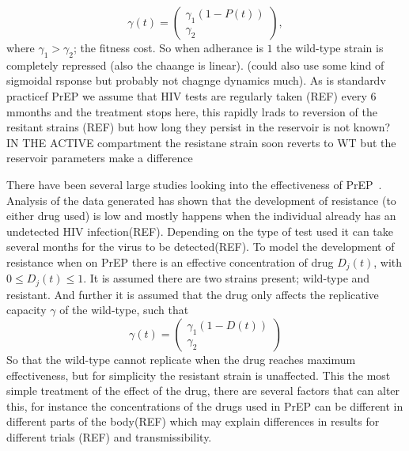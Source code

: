 \documentclass[DIV=15]{scrartcl}
\begin{document}
 \begin{equation}
\gamma (t) = \begin{pmatrix}
\gamma_1(1- P(t)) \\ \gamma_2
\end{pmatrix} , 
\label{gamma}
\end{equation}
where $\gamma_1>\gamma_2$; the fitness cost.
So when adherance is $1$ the wild-type strain is completely repressed (also the chaange is linear). (could also use some kind of sigmoidal rsponse but probably not chagnge dynamics much).  As is standardv  practicef PrEP we assume that HIV tests are regularly taken (REF) every 6 mmonths and the treatment stops here, this  rapidly  lrads to reversion of the resitant strains (REF) but how long they persist in the reservoir is not known?  IN THE ACTIVE compartment the resistane strain soon reverts to WT but the reservoir parameters make a difference 
\fi

 \iffalse
some stuff about  tenofovir resistane mutatns
\url{http://www.ncbi.nlm.nih.gov/pmc/articles/PMC3494163/}


rho is outflow -inflow no mutation low rtae in this model $ \rho = a-k/r_L$


mean generstion time in reservoir is1/a HIV

viral geneeration  is 1 day in active compartment 

\fi





There have been several large studies looking into the effectiveness of PrEP~\cite{iprex2011,partners2012}. Analysis of the data  generated has shown that the development of resistance (to either drug used) is low and mostly happens when the individual already has an undetected HIV infection(REF). Depending on the type of test used  it can take several months for the virus to be detected(REF). To  model the development of resistance when on PrEP there is an effective concentration of drug $D_j(t)$, with $0 \leq D_j(t) \leq 1$. It is assumed there are two strains present; wild-type and resistant. And further it is assumed that the drug only affects the replicative  capacity $\gamma$ of the wild-type, such that \begin{equation*}
 \gamma(t) = \begin{pmatrix} \gamma_1(1- D(t)) \\ \gamma_2 \end{pmatrix}
\end{equation*}
So that the wild-type cannot  replicate when the drug reaches maximum effectiveness, but for simplicity the resistant strain is unaffected.
This the most simple treatment of the effect of the drug, there are several factors that can alter  this, for instance the concentrations of the drugs used in PrEP can be different in different parts of the body(REF)
 which may explain differences in results for different trials (REF) and transmissibility.
\end{document}

